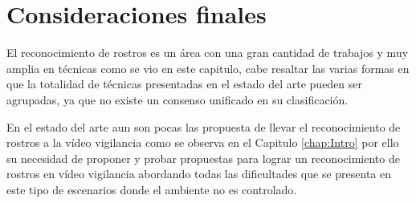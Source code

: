 \section{Consideraciones finales}
El reconocimiento de rostros es un área con una gran cantidad de trabajos y muy amplia en técnicas como se vio en este capitulo, cabe resaltar las varias formas en que la totalidad de técnicas presentadas en el estado del arte pueden ser agrupadas, ya que no existe un consenso unificado en su clasificación.

En el estado del arte aun son pocas las propuesta de llevar el reconocimiento de rostros a la vídeo vigilancia como se observa en el Capitulo \ref{chap:Intro} por ello su necesidad de proponer y probar propuestas para lograr un reconocimiento de rostros en vídeo vigilancia abordando todas las dificultades que se presenta en este tipo de escenarios donde el ambiente no es controlado.

